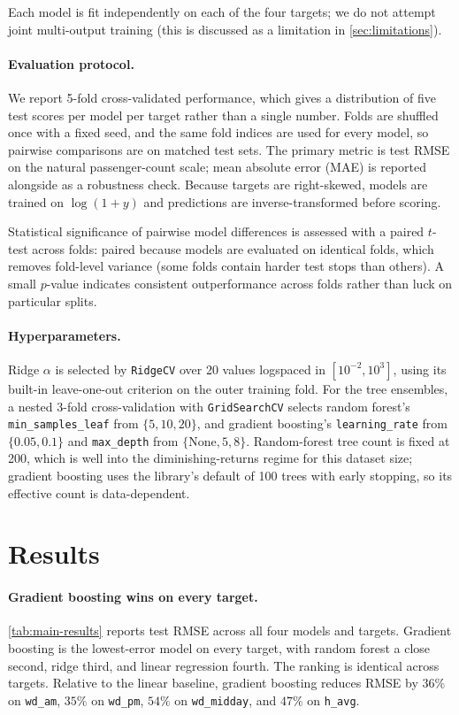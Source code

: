 \documentclass{article}
\begin{document}
Each model is fit independently on each of the four targets; we do not
attempt joint multi-output training (this is discussed as a limitation in
\cref{sec:limitations}).

\paragraph{Evaluation protocol.}
We report 5-fold cross-validated performance, which gives a distribution
of five test scores per model per target rather than a single number.
Folds are shuffled once with a fixed seed, and the same fold indices are
used for every model, so pairwise comparisons are on matched test sets.
The primary metric is test RMSE on the natural passenger-count scale;
mean absolute error (MAE) is reported alongside as a robustness check.
Because targets are right-skewed, models are trained on $\log(1+y)$ and
predictions are inverse-transformed before scoring.

Statistical significance of pairwise model differences is assessed with
a paired $t$-test across folds: paired because models are evaluated on
identical folds, which removes fold-level variance (some folds contain
harder test stops than others). A small $p$-value indicates consistent
outperformance across folds rather than luck on particular splits.

\paragraph{Hyperparameters.}
Ridge $\alpha$ is selected by \texttt{RidgeCV} over 20 values logspaced in
$[10^{-2}, 10^{3}]$, using its built-in leave-one-out criterion on the
outer training fold. For the tree ensembles, a nested 3-fold
cross-validation with \texttt{GridSearchCV} selects random forest's
\texttt{min\_samples\_leaf} from $\{5,10,20\}$, and gradient boosting's
\texttt{learning\_rate} from $\{0.05,0.1\}$ and \texttt{max\_depth} from
$\{\text{None},5,8\}$. Random-forest tree count is fixed at 200, which
is well into the diminishing-returns regime for this dataset size;
gradient boosting uses the library's default of 100 trees with early
stopping, so its effective count is data-dependent.

\section{Results}
\label{sec:results}

\paragraph{Gradient boosting wins on every target.}
\cref{tab:main-results} reports test RMSE across all four models and
targets. Gradient boosting is the lowest-error model on every target,
with random forest a close second, ridge third, and linear regression
fourth. The ranking is identical across targets. Relative to the linear
baseline, gradient boosting reduces RMSE by $36\%$ on
\texttt{wd\_am}, $35\%$ on \texttt{wd\_pm}, $54\%$ on
\texttt{wd\_midday}, and $47\%$ on \texttt{h\_avg}.
\end{document}
